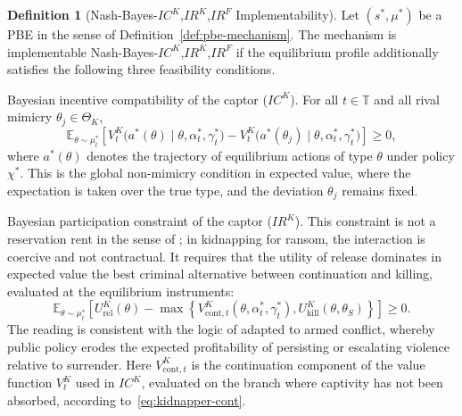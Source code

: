 \documentclass[review,authoryear,12pt]{elsarticle}
\providecommand{\textcite}{\citet}
\theoremstyle{plain}
\theoremstyle{definition}
\newtheorem{definition}[theorem]{Definition}
\newcommand{\ThetaK}{\Theta_K}
\newcommand{\1}{\mathbf{1}}
\begin{document}
\begin{definition}[Nash-Bayes-$IC^K$,$IR^K$,$IR^F$ Implementability]
\label{def:implementable-mechanism}
Let $(s^\ast,\mu^\ast)$ be a PBE in the sense of Definition~\ref{def:pbe-mechanism}. The mechanism is implementable Nash-Bayes-$IC^K$,$IR^K$,$IR^F$ if the equilibrium profile additionally satisfies the following three feasibility conditions.

\smallskip
\noindent Bayesian incentive compatibility of the captor \textup{(}$IC^K$\textup{)}. For all $t\in\mathbb{T}$ and all rival mimicry $\theta_j\in\ThetaK$,
\[
\mathbb{E}_{\theta\sim\mu_t^\ast}
\left[
V^K_t\!\bigl(a^\ast(\theta)\mid \theta,\alpha_t^\ast,\gamma_t^\ast\bigr)
-
V^K_t\!\bigl(a^\ast(\theta_j)\mid \theta,\alpha_t^\ast,\gamma_t^\ast\bigr)
\right]
\ge 0,
\]
where $a^\ast(\theta)$ denotes the trajectory of equilibrium actions of type $\theta$ under policy $\chi^\ast$. This is the global non-mimicry condition in expected value, where the expectation is taken over the true type, and the deviation $\theta_j$ remains fixed.

\smallskip
\noindent Bayesian participation constraint of the captor \textup{(}$IR^K$\textup{)}. This constraint is not a reservation rent in the sense of \textcite{Myerson1979IC}; in kidnapping for ransom, the interaction is coercive and not contractual. It requires that the utility of release dominates in expected value the best criminal alternative between continuation and killing, evaluated at the equilibrium instruments:
\[
\mathbb{E}_{\theta\sim\mu_t^\ast}
\left[
U^K_{\mathrm{rel}}(\theta)
-
\max\left\{
V^K_{\mathrm{cont},t}(\theta,\alpha_t^\ast,\gamma_t^\ast),
U^K_{\mathrm{kill}}(\theta,\theta_S)
\right\}
\right]
\ge0.
\]
The reading is consistent with the logic of \textcite{Becker1968} adapted to armed conflict, whereby public policy erodes the expected profitability of persisting or escalating violence relative to surrender. Here $V^K_{\mathrm{cont},t}$ is the continuation component of the value function $V^K_t$ used in $IC^K$, evaluated on the branch where captivity has not been absorbed, according to~\eqref{eq:kidnapper-cont}.


\end{definition}
\end{document}
